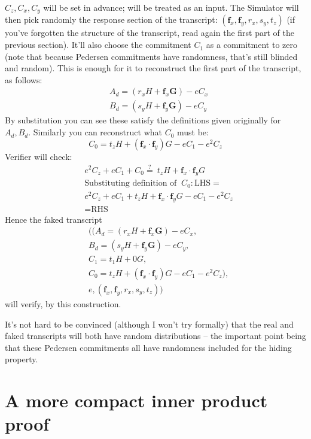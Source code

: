 \documentclass[10pt,a4paper]{article}
\begin{document}
$C_z, C_x, C_y$ will be set in advance; will be treated as an input. The Simulator will
then pick randomly the response section of the transcript: $(\textbf{f}_x, \textbf{f}_y, r_x, s_y, t_z)$ (if you've
forgotten the structure of the transcript, read again the first part of
the previous section). It'll also choose the commitment $C_1$ as a commitment
to zero (note that because Pedersen commitments have randomness, that's
still blinded and random). This is enough for it to reconstruct the
first part of the transcript, as follows:
\begin{align*}
& A_d = \left(r_x H + \textbf{f}_x \textbf{G} \right) -eC_x \\
& B_d = \left(s_y H + \textbf{f}_y \textbf{G}\right) - eC_y
\end{align*}
By substitution you can see these satisfy the definitions given
originally for $A_d, B_d$. Similarly you can reconstruct what $C_0$ must be:
\[C_0 = t_z H + \left(\textbf{f}_x \cdot \textbf{f}_y \right)G -eC_1 - e^2 C_z \]
Verifier will check:
\begin{align*}
& e^2C_z + eC_1 + C_0 \stackrel{?}{=}\  t_z H + \textbf{f}_x \cdot \textbf{f}_y G  \\
& \textrm{Substituting definition of } \ C_0 : \textrm{LHS}=\\
& e^2 C_z + eC_1 + t_zH + \textbf{f}_x \cdot \textbf{f}_y G - eC_1 - e^2C_z \\
& = \textrm{RHS}
\end{align*}
Hence the faked transcript
\begin{align*}
& ((A_d = \left(r_x H + \textbf{f}_x \textbf{G} \right) -eC_x, \\
& B_d = \left(s_y H + \textbf{f}_y \textbf{G}\right) - eC_y,  \\
& C_1 = t_1 H + 0G, \\
& C_0 = t_z H + \left(\textbf{f}_x \cdot \textbf{f}_y \right)G -eC_1 - e^2 C_z ), \\
& e, (\textbf{f}_x, \textbf{f}_y, r_x, s_y, t_z))
\end{align*}
will verify, by this construction.

It's not hard to be convinced (although I won't try formally) that the
real and faked transcripts will both have random distributions -- the
important point being that these Pedersen commitments all have
randomness included for the hiding property.

\hypertarget{a-more-compact-inner-product-proof}{%
\section[A more compact inner product
proof]{\texorpdfstring{\protect\hypertarget{anchor-41}{}{}A more compact
inner product
proof}{A more compact inner product proof}}\label{a-more-compact-inner-product-proof}}
\end{document}
